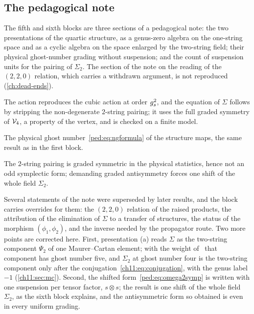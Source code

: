 

\subsection*{The pedagogical note}

The fifth and sixth blocks are three sections of a pedagogical note: the two presentations of the quartic structure, as a genus-zero \IBL{} algebra on the one-string space and as a cyclic \Loo{} algebra on the space enlarged by the two-string field; their physical ghost-number grading without suspension; and the count of suspension units for the pairing of $\Sigma_2$.
The section of the note on the reading of the $(2, 2, 0)$ relation, which carries a withdrawn argument, is not reproduced (\cref{ch:dead-ends}).

\noindent{} The \IBL{} action reproduces the cubic action at order $g_s^2$, and the equation of $\Sigma$ follows by stripping the non-degenerate $2$-string pairing; it uses the full graded symmetry of $\mathcal{V}_{4}$, a property of the vertex, and is checked on a finite model.

\noindent{} The physical ghost number~\eqref{ped:eq:ngformula} of the structure maps, the same result as in the first block.

\noindent{} The $2$-string pairing is graded symmetric in the physical statistics, hence not an odd symplectic form; demanding graded antisymmetry forces one shift of the whole field $\Sigma_2$.

Several statements of the note were superseded by later results, and the block carries overrides for them: the $(2, 2, 0)$ relation of the raised products, the attribution of the elimination of $\Sigma$ to a transfer of \IBL{} structures, the status of the morphism $(\phi_1, \phi_2)$, and the inverse needed by the propagator route.
Two more points are corrected here.
First, presentation (a) reads $\Sigma$ as the two-string component $\Psi_2$ of one Maurer--Cartan element; with the weight of~\cite{Cieliebak:2015:HomologicalAlgebraRelated} that component has ghost number five, and $\Sigma_2$ at ghost number four is the two-string component only after the conjugation~\eqref{ch11:eq:conjugation}, with the genus label $-1$ (\cref{ch11:sec:mc}).
Second, the shifted form~\eqref{ped:eq:omega2symp} is written with one suspension per tensor factor, $s \otimes s$; the result is one shift of the whole field $\Sigma_2$, as the sixth block explains, and the antisymmetric form so obtained is even in every uniform grading.

